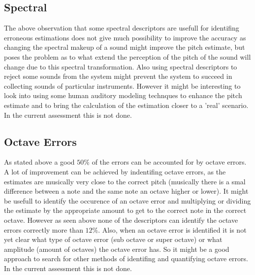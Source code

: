 \documentclass{proc}
\begin{document}
\subsection{Spectral}
The above observation that some spectral descriptors are usefull for identifing erroneous estimations does not give much possibility to improve the accuracy as changing the spectral makeup of a sound might improve the pitch estimate, but poses the problem as to what extend the perception of the pitch of the sound will change due to this spectral transformation. Also using spectral descriptors to reject some sounds from the system might prevent the system to succeed in collecting sounds of particular instruments. However it might be interesting to look into using some human auditory modeling technques to enhance the pitch estimate and to bring the calculation of the estimation closer to a 'real' scenario. In the current assessment this is not done.

\subsection{Octave Errors}
As stated above a good $50\%$ of the errors can be accounted for by octave errors. A lot of improvement can be achieved by indentifing octave errors, as the estimates are musically very close to the correct pitch (musically there is a smal difference between a note and the same note an octave higher or lower). It might be usefull to identify the occurence of an octave error and multiplying or dividing the estimate by the appropriate amount to get to the correct note in the correct octave. However as seen above none of the descriptors can identify the octave errors correctly more than $12\%$. Also, when an octave error is identified it is not yet clear what type of octave error (sub octave or super octave) or what amplitude (amount of octaves) the octave error has. So it might be a good approach to search for other methods of identifing and quantifying octave errors. In the current assessment this is not done.




\end{document}
